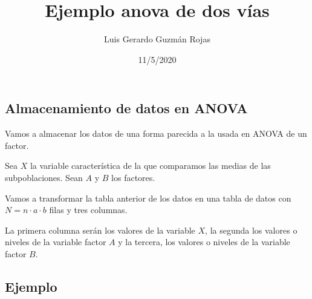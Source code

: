 \documentclass[
]{article}
\title{Ejemplo anova de dos vías}
\author{Luis Gerardo Guzmán Rojas}
\date{11/5/2020}
\begin{document}
\maketitle

\hypertarget{almacenamiento-de-datos-en-anova}{%
\subsection{Almacenamiento de datos en
ANOVA}\label{almacenamiento-de-datos-en-anova}}

Vamos a almacenar los datos de una forma parecida a la usada en ANOVA de
un factor.

Sea \(X\) la variable característica de la que comparamos las medias de
las subpoblaciones. Sean \(A\) y \(B\) los factores.

Vamos a transformar la tabla anterior de los datos en una tabla de datos
con \(N=n\cdot a\cdot b\) filas y tres columnas.

La primera columna serán los valores de la variable \(X\), la segunda
los valores o niveles de la variable factor \(A\) y la tercera, los
valores o niveles de la variable factor \(B\).

\hypertarget{ejemplo}{%
\subsection{Ejemplo}\label{ejemplo}}
\end{document}
